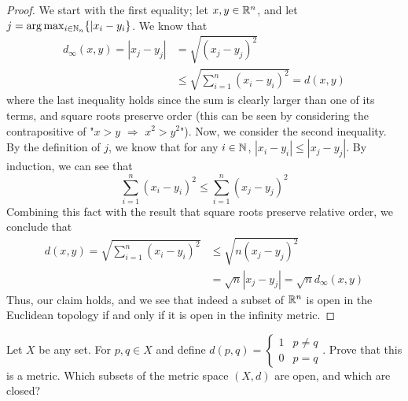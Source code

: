 \documentclass[./main.tex]{subfiles}
\begin{document}
\begin{proof}
    We start with the first equality; let $x,y\in\mathbb{R}^n$, and let $j=\arg\max_{i\in\mathbb{N}_n}\{|x_i-y_i\}$. We know that
    \begin{align*}
        d_\infty(x,y) = |x_j-y_j| &= \sqrt{(x_j-y_j)^2}\\
        &\leq \sqrt{\sum_{i=1}^n(x_i-y_i)^2} = d(x,y)
    \end{align*}
    where the last inequality holds since the sum is clearly larger than one of its terms, and square roots preserve order (this
    can be seen by considering the contrapositive of "$x>y$ $\Rightarrow$ $x^2>y^2$"). Now, we consider the second inequality. By the
    definition of $j$, we know that for any $i\in\mathbb{N}$, $|x_i-y_i|\leq |x_j-y_j|$. By induction, we can see that 
    \[
        \sum_{i=1}^n(x_i-y_i)^2 \leq \sum_{i=1}^n(x_j-y_j)^2
    \]
    Combining this fact with the result that square roots preserve relative order, we conclude that
    \begin{align*}
        d(x,y)=\sqrt{\sum_{i=1}^n(x_i-y_i)^2} &\leq \sqrt{n(x_j-y_j)^2}\\
        & = \sqrt{n}|x_j-y_j| = \sqrt{n}d_\infty(x,y)
    \end{align*}
    Thus, our claim holds, and we see that indeed a subset of $\mathbb{R}^n$ is open in the Euclidean topology if and only if it is open
    in the infinity metric.
\end{proof}


\begin{fprob}
    Let $X$ be any set. For $p,q\in X$ and define $d(p,q)=\begin{cases} 1 & p\neq q \\ 0 & p=q\end{cases}$.
    Prove that this is a metric. Which subsets of the metric space $(X,d)$ are open, and which are closed?
\end{fprob}
\end{document}
